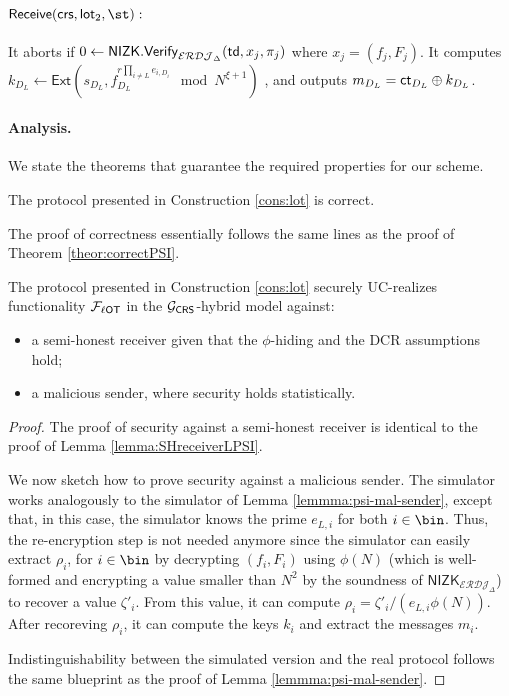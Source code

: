 \begin{construction}
\paragraph{$\mathsf{Receive}(\crs,\mathsf{lot}_2,\st):$}
It aborts if $0\gets\mathsf{NIZK.Verify}_{\mathcal{ERDJ}_\Delta}(\mathsf{td},x_j, \pi_j)$ where $x_j=(f_j,F_j)$. It computes $k_{D_L}\gets\mathsf{Ext}(s_{D_L}, f_{D_L}^{r\prod_{i\neq L}e_{i,D_i}}\mod N^{\xi+1})$ , and outputs $m_{D_L}=\mathsf{ct}_{D_L}\oplus k_{D_L}$.

\end{construction}

\paragraph{Analysis.}

 We state the theorems that guarantee the required properties for our scheme. 
\begin{theorem}
\label{theor:correctLOT}
The protocol presented in Construction \ref{cons:lot} is correct.
\end{theorem}
 
 The proof of correctness essentially follows the same lines as the proof of Theorem \ref{theor:correctPSI}.

\begin{theorem}
\label{theor:securityLOT}
The protocol presented in Construction \ref{cons:lot} securely UC-realizes functionality $\mathcal{F}_{\ell\mathsf{OT}}$ in the $\mathcal{G}_\mathsf{CRS}$-hybrid model against:
\begin{itemize}
    \item a semi-honest receiver given that the $\phi$-hiding and the DCR assumptions hold;
    \item a malicious sender, where security holds statistically.
\end{itemize}
\end{theorem}
\begin{proof}
The proof of security against a semi-honest receiver is identical to the proof of Lemma \ref{lemma:SHreceiverLPSI}.

We now sketch how to prove security against a malicious sender. The simulator works analogously to the simulator of Lemma \ref{lemmma:psi-mal-sender}, except that, in this case, the simulator knows the prime $e_{L,i}$ for both $i\in\bin$. Thus, the re-encryption step is not needed anymore since the simulator can easily extract $\rho_{i}$, for $i\in\bin$ by decrypting $(f_i, F_i)$ using $\phi(N)$ (which is well-formed and encrypting a value smaller than $N^2$ by the soundness of $\mathsf{NIZK}_{\mathcal{ERDJ}_\Delta}$) to recover a value $\zeta'_i$. From this value, it can compute $\rho_i=\zeta'_i/(e_{L,i} \phi(N))$. After recoreving $\rho_i$, it can compute the keys $k_i$ and extract the messages $m_i$.

Indistinguishability between the simulated version and the real protocol follows the same blueprint as the proof of Lemma \ref{lemmma:psi-mal-sender}.
\end{proof}


